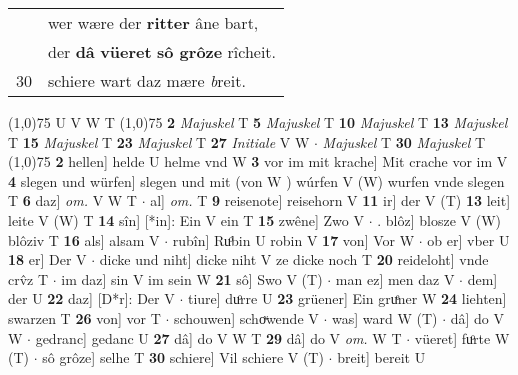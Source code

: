 \documentclass[8pt,a4paper,notitlepage]{article}
\begin{document}
\begin{table}[ht]
\begin{minipage}[t]{0.5\linewidth}
\begin{tabular}{rl}
 & wer wære der \textbf{ritter} âne bart,\\ 
 & der \textbf{dâ} \textbf{vüeret} \textbf{sô grôze} rîcheit.\\ 
30 & schiere wart daz mære \textit{b}reit.\\ 
\end{tabular}
\scriptsize
\line(1,0){75} \newline
U V W T \newline
\line(1,0){75} \newline
\textbf{2} \textit{Majuskel} T  \textbf{5} \textit{Majuskel} T  \textbf{10} \textit{Majuskel} T  \textbf{13} \textit{Majuskel} T  \textbf{15} \textit{Majuskel} T  \textbf{23} \textit{Majuskel} T  \textbf{27} \textit{Initiale} V W   $\cdot$ \textit{Majuskel} T  \textbf{30} \textit{Majuskel} T  \newline
\line(1,0){75} \newline
\textbf{2} hellen] helde U helme vnd W \textbf{3} vor im mit krache] Mit crache vor im V \textbf{4} slegen und würfen] slegen und mit (von W ) wúrfen V (W) wurfen vnde slegen T \textbf{6} daz] \textit{om.} V W T  $\cdot$ al] \textit{om.} T \textbf{9} reisenote] reisehorn V \textbf{11} ir] der V (T) \textbf{13} leit] leite V (W) T \textbf{14} sîn] [*in]: Ein V ein T \textbf{15} zwêne] Zwo V  $\cdot$ . blôz] blosze V (W) blôziv T \textbf{16} als] alsam V  $\cdot$ rubîn] Ruͦbin U robin V \textbf{17} von] Vor W  $\cdot$ ob er] vber U \textbf{18} er] Der V  $\cdot$ dicke und niht] dicke niht V ze dicke noch T \textbf{20} reideloht] vnde crv̂z T  $\cdot$ im daz] sin V im sein W \textbf{21} sô] Swo V (T)  $\cdot$ man ez] men daz V  $\cdot$ dem] der U \textbf{22} daz] [D*r]: Der V  $\cdot$ tiure] duͦrre U \textbf{23} grüener] Ein gruͤner W \textbf{24} liehten] swarzen T \textbf{26} von] vor T  $\cdot$ schouwen] schoͮwende V  $\cdot$ was] ward W (T)  $\cdot$ dâ] do V W  $\cdot$ gedranc] gedanc U \textbf{27} dâ] do V W T \textbf{29} dâ] do V \textit{om.} W T  $\cdot$ vüeret] fuͦrte W (T)  $\cdot$ sô grôze] selhe T \textbf{30} schiere] Vil schiere V (T)  $\cdot$ breit] bereit U \newline
\end{minipage}
\end{table}
\end{document}
